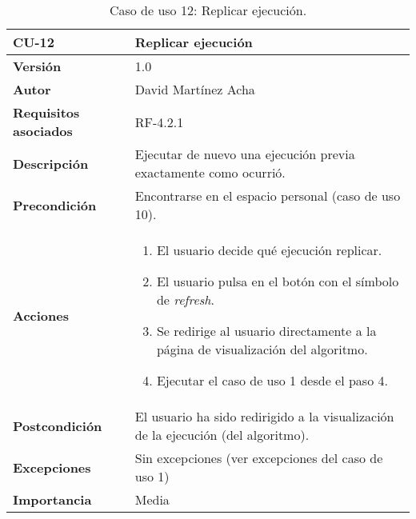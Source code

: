 \begin{table}[p]
	\centering
	\begin{tabularx}{\linewidth}{ p{} p{} }
		\toprule
		\textbf{CU-12}    & \textbf{Replicar ejecución}\\
		\toprule
		\textbf{Versión}              & 1.0    \\
		\textbf{Autor}                & David Martínez Acha \\
		\textbf{Requisitos asociados} & RF-4.2.1 \\
		\textbf{Descripción}          & Ejecutar de nuevo una ejecución previa exactamente como ocurrió. \\
		\textbf{Precondición}         & Encontrarse en el espacio personal (caso de uso 10). \\
		\textbf{Acciones}             &
		\begin{enumerate}
			\def\labelenumi{\arabic{enumi}.}
			\tightlist
			\item El usuario decide qué ejecución replicar.
			\item El usuario pulsa en el botón con el símbolo de \textit{refresh}.
			\item Se redirige al usuario directamente a la página de visualización del algoritmo.
			\item Ejecutar el caso de uso 1 desde el paso 4.
		\end{enumerate}\\
		\textbf{Postcondición}        & El usuario ha sido redirigido a la visualización de la ejecución (del algoritmo). \\
		\textbf{Excepciones}          & Sin excepciones (ver excepciones del caso de uso 1)\\
		\textbf{Importancia}          & Media \\
		\bottomrule
	\end{tabularx}
	\caption{Caso de uso 12: Replicar ejecución.}
\end{table}

